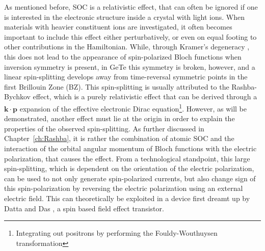 As mentioned before, SOC is a relativistic effect, that can often be ignored if one is interested in the electronic structure inside a crystal with light ions.
When materials with heavier constituent ions are investigated, it often becomes important to include this effect either perturbatively, or even on equal footing to other contributions in the Hamiltonian.
While, through Kramer's degeneracy , this does not lead to the appearance of spin-polarized Bloch functions when inversion symmetry is present, in GeTe this symmetry is broken, however, and a linear spin-splitting develops away from time-reversal symmetric points in the first Brillouin Zone (BZ).
This spin-splitting is usually attributed to the Rashba-Bychkov effect, which is a purely relativistic effect that can be derived through a $\bm{k}\cdot \bm{p}$ expansion of the effective electronic Dirac equation\footnote{Integrating out positrons by performing the Fouldy-Wouthuysen transformation}.
However, as will be demonstrated, another effect must lie at the origin in order to explain the properties of the observed spin-splitting.
As further discussed in Chapter~\ref{ch:Rashba}, it is rather the combination of atomic SOC and the interaction of the orbital angular momentum of Bloch functions with the electric polarization, that causes the effect.
From a technological standpoint, this large spin-splitting, which is dependent on the orientation of the electric polarization, can be used to not only generate spin-polarized currents, but also change sign of this spin-polarization by reversing the electric polarization using an external electric field.
This can theoretically be exploited in a device first dreamt up by Datta and Das , a spin based field effect transistor.

